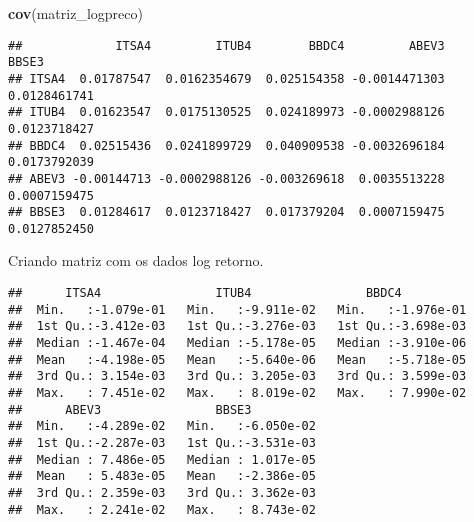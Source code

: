 \documentclass[]{article}
\newenvironment{Shaded}{\begin{snugshade}}{\end{snugshade}}
\newcommand{\KeywordTok}[1]{\textcolor[rgb]{0.13,0.29,0.53}{\textbf{{#1}}}}
\newcommand{\DataTypeTok}[1]{\textcolor[rgb]{0.13,0.29,0.53}{{#1}}}
\newcommand{\StringTok}[1]{\textcolor[rgb]{0.31,0.60,0.02}{{#1}}}
\newcommand{\NormalTok}[1]{{#1}}
\begin{document}
\begin{Shaded}
\begin{Highlighting}[]
\KeywordTok{cov}\NormalTok{(matriz_logpreco)}
\end{Highlighting}
\end{Shaded}

\begin{verbatim}
##             ITSA4         ITUB4        BBDC4         ABEV3        BBSE3
## ITSA4  0.01787547  0.0162354679  0.025154358 -0.0014471303 0.0128461741
## ITUB4  0.01623547  0.0175130525  0.024189973 -0.0002988126 0.0123718427
## BBDC4  0.02515436  0.0241899729  0.040909538 -0.0032696184 0.0173792039
## ABEV3 -0.00144713 -0.0002988126 -0.003269618  0.0035513228 0.0007159475
## BBSE3  0.01284617  0.0123718427  0.017379204  0.0007159475 0.0127852450
\end{verbatim}

Criando matriz com os dados log retorno.

\begin{Shaded}
\end{Shaded}

\begin{verbatim}
##      ITSA4                ITUB4                BBDC4           
##  Min.   :-1.079e-01   Min.   :-9.911e-02   Min.   :-1.976e-01  
##  1st Qu.:-3.412e-03   1st Qu.:-3.276e-03   1st Qu.:-3.698e-03  
##  Median :-1.467e-04   Median :-5.178e-05   Median :-3.910e-06  
##  Mean   :-4.198e-05   Mean   :-5.640e-06   Mean   :-5.718e-05  
##  3rd Qu.: 3.154e-03   3rd Qu.: 3.205e-03   3rd Qu.: 3.599e-03  
##  Max.   : 7.451e-02   Max.   : 8.019e-02   Max.   : 7.990e-02  
##      ABEV3                BBSE3           
##  Min.   :-4.289e-02   Min.   :-6.050e-02  
##  1st Qu.:-2.287e-03   1st Qu.:-3.531e-03  
##  Median : 7.486e-05   Median : 1.017e-05  
##  Mean   : 5.483e-05   Mean   :-2.386e-05  
##  3rd Qu.: 2.359e-03   3rd Qu.: 3.362e-03  
##  Max.   : 2.241e-02   Max.   : 8.743e-02
\end{verbatim}
\end{document}
